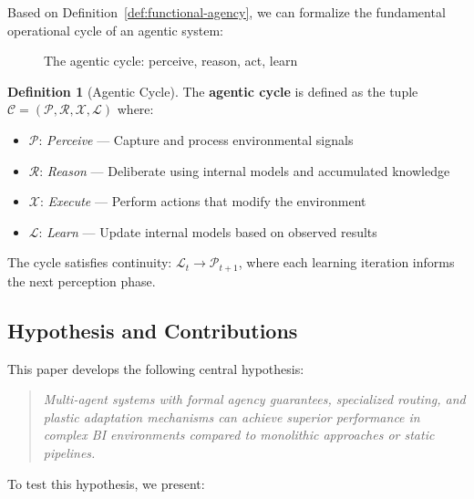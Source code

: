 \documentclass[11pt,a4paper]{article}
\theoremstyle{definition}
\newtheorem{definition}{Definition}[section]
\theoremstyle{remark}
\begin{document}
Based on Definition~\ref{def:functional-agency}, we can formalize the fundamental operational cycle of an agentic system:

\begin{figure}[H]
    \centering
    
    \caption{The agentic cycle: perceive, reason, act, learn}
    \label{fig:agentic-cycle}
\end{figure}

\begin{definition}[Agentic Cycle]
\label{def:agentic-cycle}
The \textbf{agentic cycle} is defined as the tuple $\mathcal{C} = (\mathcal{P}, \mathcal{R}, \mathcal{X}, \mathcal{L})$ where:

\begin{itemize}
    \item $\mathcal{P}$: \textit{Perceive} --- Capture and process environmental signals
    \item $\mathcal{R}$: \textit{Reason} --- Deliberate using internal models and accumulated knowledge
    \item $\mathcal{X}$: \textit{Execute} --- Perform actions that modify the environment
    \item $\mathcal{L}$: \textit{Learn} --- Update internal models based on observed results
\end{itemize}

The cycle satisfies continuity: $\mathcal{L}_t \rightarrow \mathcal{P}_{t+1}$, where each learning iteration informs the next perception phase.
\end{definition}

\subsection{Hypothesis and Contributions}

This paper develops the following central hypothesis:

\begin{quote}
\textit{Multi-agent systems with formal agency guarantees, specialized routing, and plastic adaptation mechanisms can achieve superior performance in complex BI environments compared to monolithic approaches or static pipelines.}
\end{quote}

To test this hypothesis, we present:
\end{document}

